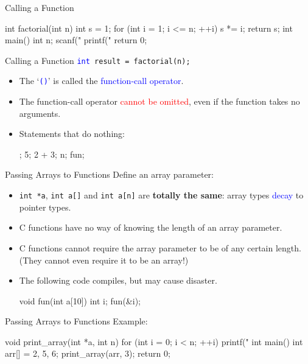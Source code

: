 \documentclass{beamer}
\newcommand{\red}[1]{\textcolor{red}{#1}}
\newcommand{\blue}[1]{\textcolor{blue}{#1}}
\newcommand{\ttt}[1]{\texttt{#1}}
\newcommand{\bluett}[1]{\blue{\ttt{#1}}}
\begin{document}
\begin{frame}[fragile]{Calling a Function}
	\begin{cpp}
int factorial(int n) {
  int s = 1;
  for (int i = 1; i <= n; ++i)
    s *= i;
  return s;
}
int main() {
  int n;
  scanf("%
  printf("%
  return 0;
}
	\end{cpp}
\end{frame}

\begin{frame}[fragile]{Calling a Function}
	\bluett{int }\ttt{result = factorial(n);}
	\begin{itemize}
		\item The `\bluett{()}' is called the \blue{function-call operator}.
		\item The function-call operator \red{cannot be omitted}, even if the function takes no arguments.
		\pause
		\item Statements that do nothing:
		\begin{cpp}
;
5;
2 + 3;
{}
n;
fun;
		\end{cpp}
	\end{itemize}
\end{frame}

\begin{frame}[fragile]{Passing Arrays to Functions}
	Define an array parameter:
	\begin{itemize}
		\item \ttt{int *a}, \ttt{int a[]} and \ttt{int a[n]} are \textbf{totally the same}: array types \blue{decay} to pointer types.
		\pause
		\item C functions have no way of knowing the length of an array parameter.
		\item C functions cannot require the array parameter to be of any certain length. (They cannot even require it to be an array!)
		\pause
		\item The following code compiles, but may cause disaster.
		\begin{cpp}
void fun(int a[10]) {}
int i;
fun(&i);
		\end{cpp}
	\end{itemize}
\end{frame}

\begin{frame}[fragile]{Passing Arrays to Functions}
	Example:
	\begin{cpp}
void print_array(int *a, int n) {
  for (int i = 0; i < n; ++i)
    printf("%
}
int main() {
  int arr[] = {2, 5, 6};
  print_array(arr, 3);
  return 0;
}
	\end{cpp}
\end{frame}
\end{document}
